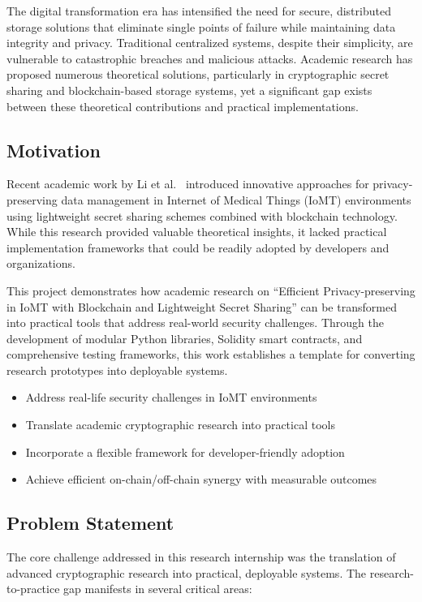 \documentclass[12pt,a4paper]{article}
\begin{document}
The digital transformation era has intensified the need for secure, distributed storage solutions that eliminate single points of failure while maintaining data integrity and privacy. Traditional centralized systems, despite their simplicity, are vulnerable to catastrophic breaches and malicious attacks. Academic research has proposed numerous theoretical solutions, particularly in cryptographic secret sharing and blockchain-based storage systems, yet a significant gap exists between these theoretical contributions and practical implementations.

\subsection{Motivation}

Recent academic work by Li et al.~\cite{li2023efficient} introduced innovative approaches for privacy-preserving data management in Internet of Medical Things (IoMT) environments using lightweight secret sharing schemes combined with blockchain technology. While this research provided valuable theoretical insights, it lacked practical implementation frameworks that could be readily adopted by developers and organizations.

This project demonstrates how academic research on “Efficient Privacy-preserving in IoMT with Blockchain and Lightweight Secret Sharing” can be transformed into practical tools that address real-world security challenges. Through the development of modular Python libraries, Solidity smart contracts, and comprehensive testing frameworks, this work establishes a template for converting research prototypes into deployable systems.

\begin{itemize}
    \item Address real-life security challenges in IoMT environments
    \item Translate academic cryptographic research into practical tools
    \item Incorporate a flexible framework for developer-friendly adoption
    \item Achieve efficient on-chain/off-chain synergy with measurable outcomes
\end{itemize}

\subsection{Problem Statement}

The core challenge addressed in this research internship was the translation of advanced cryptographic research into practical, deployable systems. The research-to-practice gap manifests in several critical areas:
\end{document}
